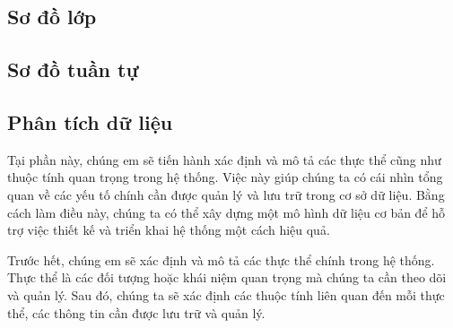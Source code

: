 \subsection{Sơ đồ lớp}

\subsection{Sơ đồ tuần tự}

\subsection{Phân tích dữ liệu}

Tại phần này, chúng em sẽ tiến hành xác định và mô tả các thực thể cũng như
 thuộc tính quan trọng trong hệ thống. Việc này giúp chúng ta có cái
  nhìn tổng quan về các yếu tố chính cần được quản lý và lưu trữ
   trong cơ sở dữ liệu. Bằng cách làm điều này, chúng ta có thể
    xây dựng một mô hình dữ liệu cơ bản để hỗ trợ việc thiết kế và
     triển khai hệ thống một cách hiệu quả.

     Trước hết, chúng em sẽ xác định và mô tả các thực thể chính trong hệ
      thống. Thực thể là các đối tượng hoặc khái niệm quan
       trọng mà chúng ta cần theo dõi và quản lý. Sau đó, chúng ta sẽ xác
        định các thuộc tính liên quan đến mỗi thực thể, các thông tin cần
         được lưu trữ và quản lý.

